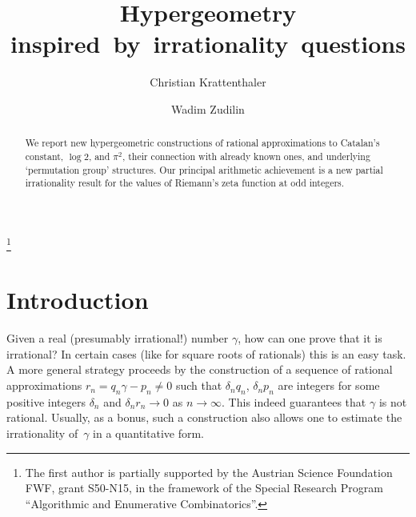 \documentclass[12pt,reqno]{amsart}
\begin{document}
\title{Hypergeometry inspired~by~irrationality~questions}

\author{Christian Krattenthaler}
\address{Fakult\"at f\"ur Mathematik, Universit\"at Wien, Oskar-Morgenstern-Platz 1, A-1090 Vienna, Austria}

\author{Wadim Zudilin}
\address{Department of Mathematics, IMAPP, Radboud University, PO Box 9010, 6500~GL Nijmegen, Netherlands}




\thanks{The first author is partially supported by the Austrian Science Foundation FWF, grant S50-N15,
in the framework of the Special Research Program ``Algorithmic and Enumerative Combinatorics''.}

\begin{abstract}
We report new hypergeometric constructions of rational approximations to Catalan's constant, $\log2$, and $\pi^2$,
their connection with already known ones, and underlying `permutation group' structures.
Our principal arithmetic achievement is a new partial irrationality result for the values of Riemann's zeta function at odd integers.
\end{abstract}

\maketitle

\section{Introduction}
\label{s1}

Given a real (presumably irrational!) number $\gamma$, how can one prove that it is irrational?
In certain cases (like for square roots of rationals) this is an easy task.
A more general strategy proceeds by the construction of a sequence of rational approximations $r_n=q_n\gamma-p_n\ne0$
such that $\delta_nq_n$, $\delta_np_n$ are integers for some positive integers $\delta_n$ and
$\delta_nr_n\to0$ as $n\to\infty$. This indeed guarantees that $\gamma$ is not rational.
Usually, as a bonus, such a construction also allows one to estimate the irrationality of~$\gamma$ in a quantitative form.
\end{document}
